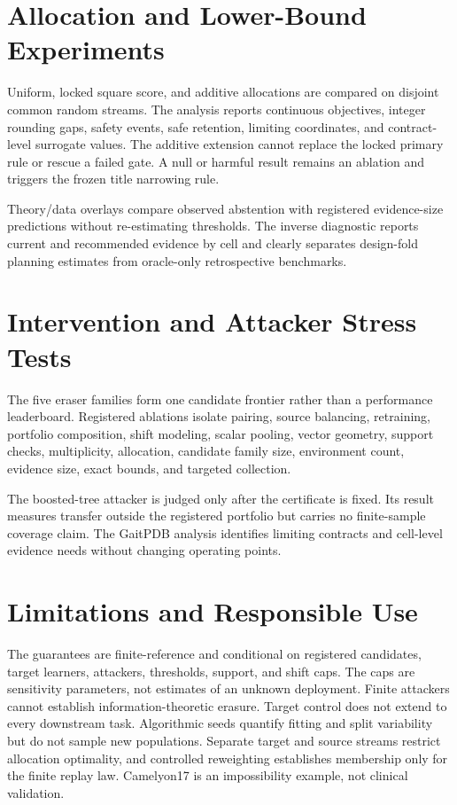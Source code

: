 \section{Allocation and Lower-Bound Experiments}
\label{neurips:sec:allocation-results}

\ControlledAllocationResult

Uniform, locked square score, and additive
allocations are compared on disjoint common random streams. The analysis
reports continuous objectives, integer rounding gaps, safety events, safe
retention, limiting coordinates, and contract-level surrogate values. The
additive extension cannot replace the locked primary rule or rescue a failed
gate. A null or harmful result remains an ablation and triggers the frozen title
narrowing rule.

\ControlledEvidenceResult{} Theory/data overlays compare observed abstention with
registered evidence-size predictions without re-estimating thresholds. The
inverse diagnostic reports current and recommended evidence by cell and clearly
separates design-fold planning estimates from oracle-only retrospective
benchmarks.

\section{Intervention and Attacker Stress Tests}
\label{neurips:sec:stress}

The five eraser families form one candidate frontier rather than a performance
leaderboard. Registered ablations isolate pairing, source balancing, retraining,
portfolio composition, shift modeling, scalar pooling, vector geometry,
support checks, multiplicity, allocation, candidate family size, environment
count, evidence size, exact bounds, and targeted collection.

\ControlledHeldoutResult{} The boosted-tree attacker is judged only after the
certificate is fixed. Its result measures transfer outside the registered
portfolio but carries no finite-sample coverage claim. \ControlledGaitResult{}
The GaitPDB analysis identifies limiting contracts and cell-level evidence
needs without changing operating points.

\section{Limitations and Responsible Use}
\label{neurips:sec:limits}

The guarantees are finite-reference and conditional on registered candidates,
target learners, attackers, thresholds, support, and shift caps. The caps are
sensitivity parameters, not estimates of an unknown deployment. Finite
attackers cannot establish information-theoretic erasure. Target control does
not extend to every downstream task. Algorithmic seeds quantify fitting and
split variability but do not sample new populations. Separate target and source
streams restrict allocation optimality, and controlled reweighting establishes
membership only for the finite replay law. Camelyon17 is an impossibility
example, not clinical validation.

